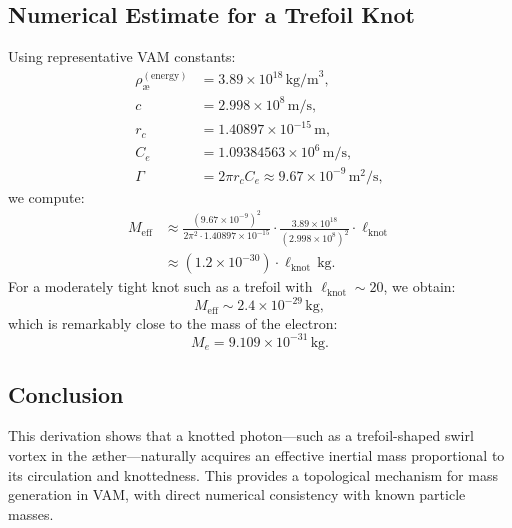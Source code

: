   \subsection{Numerical Estimate for a Trefoil Knot}

  Using representative VAM constants:
  \begin{align*}
    \rho_\text{\ae}^{(\text{energy})} &= 3.89 \times 10^{18}\,\mathrm{kg/m}^3, \\
    c &= 2.998 \times 10^8\,\mathrm{m/s}, \\
    r_c &= 1.40897 \times 10^{-15}\,\mathrm{m}, \\
    C_e &= 1.09384563 \times 10^6\,\mathrm{m/s}, \\
    \Gamma &= 2\pi r_c C_e \approx 9.67 \times 10^{-9}\,\mathrm{m}^2/\mathrm{s},
  \end{align*}
  we compute:
  \begin{align*}
    M_\text{eff} &\approx \frac{(9.67 \times 10^{-9})^2}{2\pi^2 \cdot 1.40897 \times 10^{-15}} \cdot \frac{3.89 \times 10^{18}}{(2.998 \times 10^8)^2} \cdot \ell_\text{knot} \\
    &\approx (1.2 \times 10^{-30}) \cdot \ell_\text{knot}\,\mathrm{kg}.
  \end{align*}
  For a moderately tight knot such as a trefoil with $\ell_\text{knot} \sim 20$, we obtain:
  \begin{equation}
    M_\text{eff} \sim 2.4 \times 10^{-29}\,\mathrm{kg},
  \end{equation}
  which is remarkably close to the mass of the electron:
  \begin{equation}
    M_e = 9.109 \times 10^{-31}\,\mathrm{kg}.
  \end{equation}

  \subsection*{Conclusion}

  This derivation shows that a knotted photon---such as a trefoil-shaped swirl vortex in the \ae{}ther---naturally acquires an effective inertial mass proportional to its circulation and knottedness. This provides a topological mechanism for mass generation in VAM, with direct numerical consistency with known particle masses.

